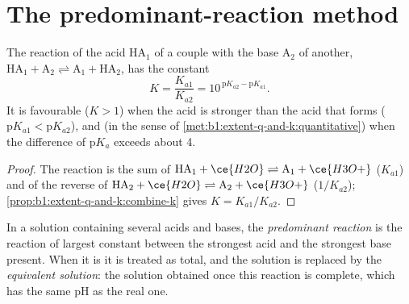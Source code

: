 \section{The predominant-reaction method}

\begin{proposition}\label{prop:b1:predominant-reaction:k-of-reaction}
The reaction of the acid $\mathrm{HA}_1$ of a couple with the base
$\mathrm{A}_2$ of another,
$\mathrm{HA}_1 + \mathrm{A}_2 \rightleftharpoons \mathrm{A}_1 + \mathrm{HA}_2$,
has the constant
\[
  K = \frac{K_{a1}}{K_{a2}} = 10^{\,\mathrm{p}K_{a2} - \mathrm{p}K_{a1}} .
\]
It is favourable ($K > 1$) when the acid is stronger than the acid that
forms ($\mathrm{p}K_{a1} < \mathrm{p}K_{a2}$), and  (in the
sense of \cref{met:b1:extent-q-and-k:quantitative}) when the difference
of $\mathrm{p}K_a$ exceeds about 4.
\end{proposition}

\begin{proof}
The reaction is the sum of $\mathrm{HA}_1 + \ce{H2O} \rightleftharpoons
\mathrm{A}_1 + \ce{H3O+}$ ($K_{a1}$) and of the reverse of $\mathrm{HA}_2 +
\ce{H2O} \rightleftharpoons \mathrm{A}_2 + \ce{H3O+}$ ($1/K_{a2}$);
\cref{prop:b1:extent-q-and-k:combine-k} gives $K = K_{a1}/K_{a2}$.
\end{proof}

\begin{definition}\label{def:b1:predominant-reaction:predominant-reaction}
In a solution containing several acids and bases, the \emph{predominant
reaction} is the reaction of largest constant
between the strongest acid and the strongest base present. When it is
 it is treated as total, and the solution is replaced by the
\emph{equivalent solution}: the solution
obtained once this reaction is complete, which has the same pH as the
real one.
\end{definition}

